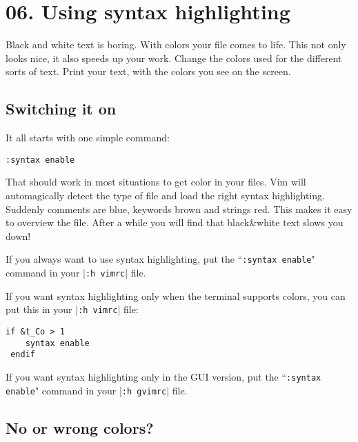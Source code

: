 \section{06. Using syntax highlighting}
\label{Using syntax highlighting}
Black and white text is boring.  With colors your file comes to life.  This
not only looks nice, it also speeds up your work.  Change the colors used for
the different sorts of text.  Print your text, with the colors you see on the
screen.
\localtableofcontents
\subsection{Switching it on}

It all starts with one simple command:

 \begin{Verbatim}[samepage=true]
 :syntax enable
 \end{Verbatim}

That should work in most situations to get color in your files.
Vim will automagically detect the type of file and load the right syntax highlighting.
Suddenly comments are blue, keywords brown and strings red.
This makes it easy to overview the file.
After a while you will find that black\&white text slows you down!

If you always want to use syntax highlighting, put the ``\texttt{:syntax enable}" command in your |\texttt{:h vimrc}| file.

If you want syntax highlighting only when the terminal supports colors, you can put this in your |\texttt{:h vimrc}| file:

 \begin{Verbatim}[samepage=true]
 if &t_Co > 1
    syntax enable
 endif
 \end{Verbatim}

If you want syntax highlighting only in the GUI version, put the ``\texttt{:syntax enable}" command in your |\texttt{:h gvimrc}| file.

\subsection{No or wrong colors?}
\label{No or wrong colors?}

